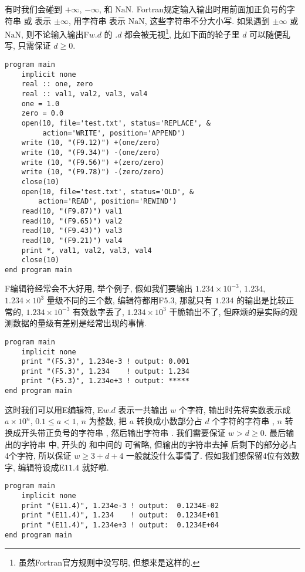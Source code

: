 有时我们会碰到  $ +\infty $, $ -\infty $, 和 $ \text{NaN} $. Fortran规定输入输出时用前面加正负号的字符串  或  表示 $ \pm\infty $, 用字符串  表示 $ \text{NaN} $, 这些字符串不分大小写. 如果遇到 $ \pm\infty $ 或 $ \text{NaN} $, 则不论输入输出F$ w. d $ 的 $. d $ 都会被无视\footnote{虽然Fortran官方规则中没写明, 但想来是这样的.\label{edit_IEEE}}, 比如下面的轮子里 $ d $ 可以随便乱写, 只需保证 $ d\geqslant0 $. 
\begin{lstlisting}
program main
    implicit none
    real :: one, zero
    real :: val1, val2, val3, val4
    one = 1.0
    zero = 0.0
    open(10, file='test.txt', status='REPLACE', &
         action='WRITE', position='APPEND')
    write (10, "(F9.12)") +(one/zero)
    write (10, "(F9.34)") -(one/zero)
    write (10, "(F9.56)") +(zero/zero)
    write (10, "(F9.78)") -(zero/zero)
    close(10)
    open(10, file='test.txt', status='OLD', &
        action='READ', position='REWIND')
    read(10, "(F9.87)") val1
    read(10, "(F9.65)") val2
    read(10, "(F9.43)") val3
    read(10, "(F9.21)") val4
    print *, val1, val2, val3, val4
    close(10)
end program main
\end{lstlisting}

F编辑符经常会不大好用, 举个例子, 假如我们要输出 $ 1.234\times10^{-3}  $, $ 1.234 $, $ 1.234\times10^{3}  $ 量级不同的三个数, 编辑符都用F$ 5.3 $, 那就只有 $ 1.234 $ 的输出是比较正常的, $ 1.234\times10^{-3}  $ 有效数字丢了, $ 1.234\times10^{3}  $ 干脆输出不了, 但麻烦的是实际的观测数据的量级有差别是经常出现的事情. 
\begin{lstlisting}
program main
    implicit none
    print "(F5.3)", 1.234e-3 ! output: 0.001
    print "(F5.3)", 1.234    ! output: 1.234
    print "(F5.3)", 1.234e+3 ! output: *****
end program main
\end{lstlisting}
这时我们可以用E编辑符, E$ w. d $ 表示一共输出 $ w $ 个字符, 输出时先将实数表示成 $ a\times10^{n} $, $ 0.1\leqslant a<1 $, $ n $ 为整数, 把 $ a $ 转换成小数部分占 $ d $ 个字符的字符串 , $ n $ 转换成开头带正负号的字符串 , 然后输出字符串 . 我们需要保证 $ w>d\geqslant0 $. 最后输出的字符串  中, 开头的  和中间的  可省略, 但输出的字符串去掉  后剩下的部分必占4个字符, 所以保证 $ w\geqslant 3+d+4 $ 一般就没什么事情了. 假如我们想保留4位有效数字, 编辑符设成E$ 11.4 $ 就好啦. 
\begin{lstlisting}
program main
    implicit none
    print "(E11.4)", 1.234e-3 ! output:  0.1234E-02
    print "(E11.4)", 1.234    ! output:  0.1234E+01
    print "(E11.4)", 1.234e+3 ! output:  0.1234E+04
end program main
\end{lstlisting}

